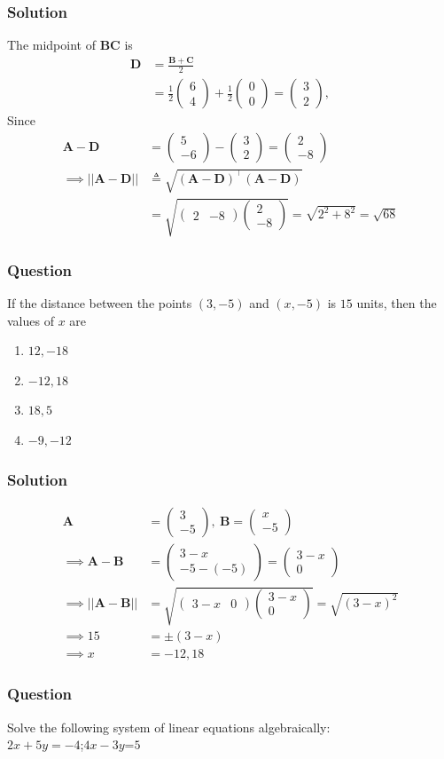 \documentclass{beamer}
\providecommand{\brak}[1]{\ensuremath{\left(#1\right)}}
\theoremstyle{remark}
\newcommand{\myvec}[1]{\ensuremath{\begin{pmatrix}#1\end{pmatrix}}}
\let\vec\mathbf
\begin{document}
\begin{frame}
\frametitle{Solution}
The midpoint of $\vec{BC}$ is 
\begin{align}
    \vec{D} &= \frac{\vec{B} + \vec{C}}{2}\\
    &=\frac{1}{2}\myvec{
        6\\
        4
    }
    +
   \frac{1}{2} \myvec{
        0\\
        0
    } = \myvec{
        3\\
        2
    },
\end{align}
Since
\begin{align}
\vec{A}-\vec{D} &= \myvec{
        5\\
        -6
    }-\myvec{
        3\\
        2
    }=
    \myvec{
        2\\
        -8
    }
\\    \implies \lvert\lvert \vec{A}-\vec{D} \rvert\rvert &\triangleq \sqrt{\brak{\vec{A}-\vec{D}}^\top\brak{\vec{A}-\vec{D}}} \label{9}\\
    &= \sqrt{\myvec{
        2 & -8 
    }
    \myvec{
        2\\
        -8
    }}
    = \sqrt{2^2+8^2} =\sqrt{68} 
\end{align}
\end{frame}

\begin{frame}
\frametitle{Question }
If the distance between the points $\brak{3,-5}$ and $\brak{x,-5}$ is $15$ units, then the values of $x$ are
\begin{enumerate}
\item  $12,-18$
\item  $-12,18$
\item  $18,5$
\item  $-9,-12$
\end{enumerate}
\end{frame}
\begin{frame}
\frametitle{Solution}
\begin{align}
	\vec{A} &=
    \myvec{
3 \\
-5 
},\
\vec{B} =
    \myvec{
x \\
-5 
}\\
\implies \vec{A}-\vec{B} &= \myvec{
        3-x\\
        -5 -\brak{-5}
    } = \myvec{
        3-x\\
        0
    }
    \\
\implies      \lvert\lvert \vec{A}-\vec{B} \rvert\rvert 
&= \sqrt{\myvec{
        3-x & 0
    }
\myvec{
        3-x\\
        0
    }}
     = \sqrt{\brak{3-x}^2}\\
\implies  15 &= \pm\brak{3-x}\\
 \implies  x &= -12,18
\end{align}
\end{frame}
%
\begin{frame}
\frametitle{Question }
Solve the following system of linear equations algebraically:\\
$2x+5y=-4$;$4x-3y$=$5$
\end{frame}
\end{document}
